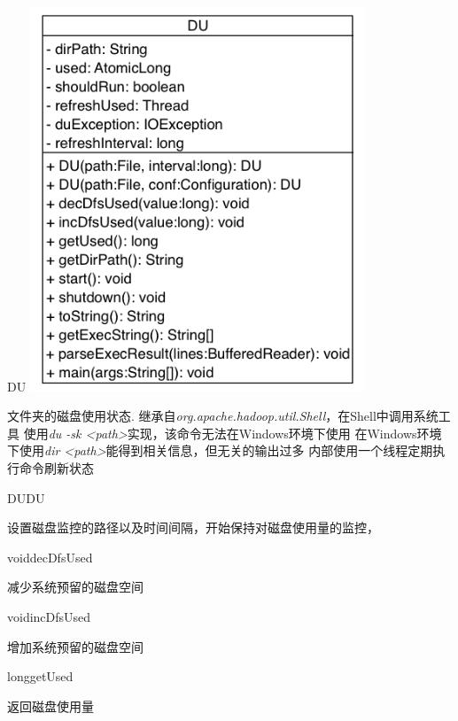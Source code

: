 \begin{XeClass}{DU}
\includegraphics[width=10cm]{cdig/DU.png}
     
 文件夹的磁盘使用状态.
 继承自\emph{org.apache.hadoop.util.Shell}，在Shell中调用系统工具
 使用\emph{du -sk <path>}实现，该命令无法在Windows环境下使用
 在Windows环境下使用\emph{dir <path>}能得到相关信息，但无关的输出过多
 内部使用一个线程定期执行命令刷新状态

    \begin{XeMethod}{\XePublic}{DU}{DU}
         
 设置磁盘监控的路径以及时间间隔，开始保持对磁盘使用量的监控，

    \end{XeMethod}

    \begin{XeMethod}{\XePublic}{void}{decDfsUsed}
         
 减少系统预留的磁盘空间

    \end{XeMethod}

    \begin{XeMethod}{\XePublic}{void}{incDfsUsed}
         
 增加系统预留的磁盘空间

    \end{XeMethod}

    \begin{XeMethod}{\XePublic}{long}{getUsed}
         
 返回磁盘使用量


\end{XeMethod}
\end{XeClass}
